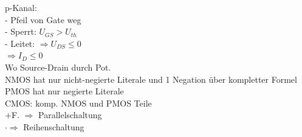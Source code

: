 \documentclass[11pt]{article}
\begin{document}
\begin{minipage}{0.33\textwidth}
p-Kanal:\\
- Pfeil von Gate weg\\
- Sperrt: $U_{GS} > U_{th}$\\
- Leitet: $\Rightarrow U_{DS} \leq 0$\\
\phantom{ssssisisssi}$\Rightarrow I_D \leq 0$\\
Wo Source-Drain durch Pot.\\
NMOS hat nur nicht-negierte Literale und 1 Negation über kompletter Formel\\
PMOS hat nur negierte Literale\\
CMOS: komp. NMOS und PMOS Teile\\
$+$F. $\Rightarrow$ Parallelschaltung\\
$\mathbf{\cdot} \Rightarrow$ Reihenschaltung\\
\end{minipage}
~~~~~~~
\end{document}
